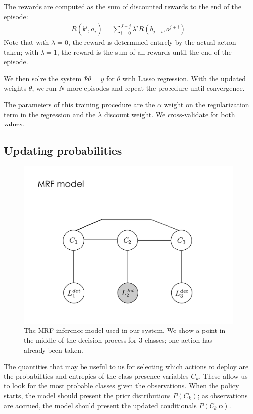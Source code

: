 The rewards are computed as the sum of discounted rewards to the end of the episode:
\begin{align}
R(b^j,a_i) = \sum_{i=0}^{J-j} \lambda^i R(b_{j+i},a^{j+i})
\end{align}
Note that with $\lambda=0$, the reward is determined entirely by the actual action taken; with $\lambda=1$, the reward is the sum of all rewards until the end of the episode.

We then solve the system $\Phi \theta = y$ for $\theta$ with Lasso regression.
With the updated weights $\theta$, we run $N$ more episodes and repeat the procedure until convergence.

The parameters of this training procedure are the $\alpha$ weight on the regularization term in the regression and the $\lambda$ discount weight.
We cross-validate for both values.


\subsection{Updating probabilities}
\begin{figure}[h!]
\centering
\includegraphics[width=0.56\linewidth]{../figures/inf_model_mrf_1.pdf}
\caption{
The MRF inference model used in our system.
We show a point in the middle of the decision process for 3 classes; one action has already been taken.
}
\label{fig:model}
\end{figure}


The quantities that may be useful to us for selecting which actions to deploy are the probabilities and entropies of the class presence variables $C_k$.
These allow us to look for the most probable classes given the observations.
When the policy starts, the model should present the prior distributions $P(C_k)$; as observations are accrued, the model should present the updated conditionals $P(C_k|\mathbf{o})$.

